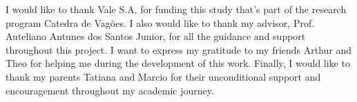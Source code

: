 \documentclass[
	oldfontcommands,
	sumario=abnt-6027-2012,
	12pt,			%
	openright,		%
	oneside,		%
	a4paper,		%
	brazil,			%
	english,		%
	]{imecc-unicamp}
\begin{document}
\begin{agradecimentos}
I would like to thank Vale S.A. for funding this study that's part of the research program Catedra de Vagões. I also would like to thank my advisor, Prof. Auteliano Antunes dos Santos Junior, for all the guidance and support throughout this project. I want to express my gratitude to my friends Arthur and Theo for helping me during the development of this work. Finally, I would like to thank my parents Tatiana and Marcio for their unconditional support and encouragement throughout my academic journey.
\end{agradecimentos}
\end{document}
